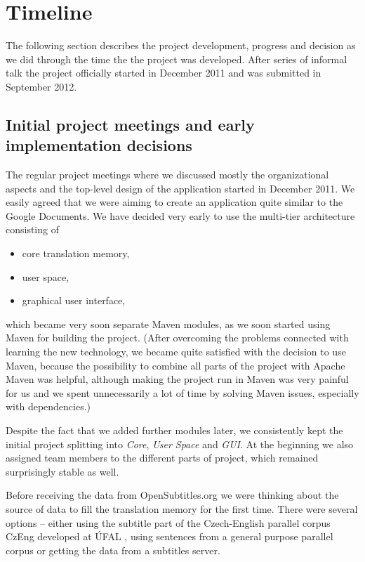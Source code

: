 \section{Timeline}

The following section describes the project development, progress and decision as we did through the time the the project was developed. After series of informal talk the project officially started in December 2011  and was submitted in September 2012.

\subsection{Initial project meetings and early implementation decisions}

The regular project meetings where we discussed mostly the organizational aspects and the top-level design of the application started in December 2011. We easily agreed that we were aiming to create an application quite similar to the Google Documents. We have decided very early to use the multi-tier architecture consisting of

\begin{itemize}
\item core translation memory,
\item user space,
\item graphical user interface,
\end{itemize}

which became very soon separate Maven modules, as we soon started using Maven for building the project.
(After overcoming the problems connected with learning the new technology, we became quite satisfied with the decision to use Maven, because the possibility to combine all parts of the project with Apache Maven was helpful, although making the project run in Maven was very painful for us and we spent unnecessarily a lot of time by solving Maven issues, especially with dependencies.)


Despite the fact that we added further modules later, we consistently kept the initial project splitting into \emph{Core}, \emph{User Space} and \emph{GUI}. At the beginning we also assigned team members to the different parts of project, which remained surprisingly stable as well. 

Before receiving the data from OpenSubtitles.org we were thinking about the source of data to fill the translation memory for the first time. There were several options -- either using the subtitle part of the Czech-English parallel corpus CzEng developed at ÚFAL , using sentences from a general purpose parallel corpus or getting the data from a subtitles server.

